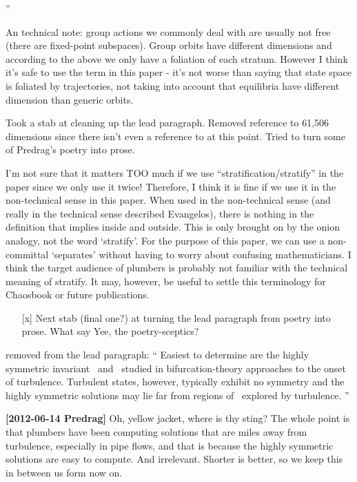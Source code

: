 \begin{description}
''
\item[2012-06-15 Evangelos] An technical note: group actions we
commonly deal with are usually not free (there are fixed-point subspaces).
Group orbits have different dimensions and according to the above
we only have a foliation of each stratum.
However I think it's safe to use the term in this paper - it's not worse than
saying that state space is foliated by trajectories, not taking into account
that equilibria have different dimension than generic orbits.

\item[2012-06-11 Daniel] Took a stab at cleaning up the lead paragraph.
Removed reference to 61,506 dimensions since there isn't even a reference
to  at this point. Tried to turn some of Predrag's poetry
into prose.

I'm not sure that it matters TOO much if we use
``stratification/stratify'' in the paper since we only use it twice!
Therefore, I think it is fine if we use it in the non-technical sense in
this paper. When used in the non-technical sense (and really in the
technical sense described Evangelos), there is nothing in the definition
that implies inside and outside. This is only brought on by the onion
analogy, not the word `stratify'. For the purpose of this paper, we can
use a non-committal `separates' without having to worry about confusing
mathematicians. I think the target audience of plumbers is probably not
familiar with the technical meaning of stratify. It may, however, be
useful to settle this terminology for Chaosbook or future publications.

\item[2012-06-14 Predrag]

\begin{itemize}
  \item[{[x]}] Next stab (final one?) at turning the lead
paragraph from poetry into prose. What say Yee, the poetry-sceptics?

\end{itemize}

\item[2012-06-15 Evangelos]
removed from the lead paragraph: ``
 Easiest to
 determine are the highly symmetric invariant \eqva\ and \reqva\ studied
 in bifurcation-theory approaches to the onset of turbulence. Turbulent
 states, however, typically exhibit no symmetry and the highly symmetric
 solutions may lie far from regions of \statesp\ explored by turbulence.
''

{\bf [2012-06-14 Predrag]} Oh, yellow jacket, where is thy sting? The
whole point is that plumbers have been computing solutions that are miles
away from turbulence, especially in pipe flows, and that is because the
highly symmetric solutions are easy to compute. And irrelevant. Shorter
is better, so we keep this in between us form now on.



\end{description}
